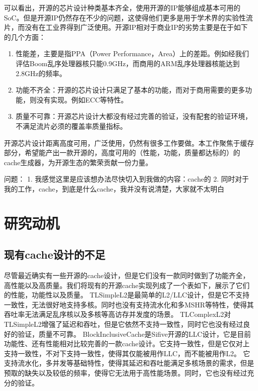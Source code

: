 可以看出，开源的芯片设计种类基本齐全，使用开源的IP能够组成基本可用的SoC。但是开源IP仍然存在不少的问题，这使得他们更多是用于学术界的实验性流片，而没有在工业界得到广泛使用。开源IP相对于商业IP的劣势主要是在于如下的几个方面：

\begin{enumerate}
	\item 性能差，主要是指PPA（Power Performance，Area）上的差距。例如经我们评估Boom乱序处理器核只能0.9GHz，而商用的ARM乱序处理器核能达到2.8GHz的频率。
	\item 功能不齐全：开源的芯片设计只满足了基本的功能，而对于商用需要的更多功能，则没有实现。例如ECC等特性。
	\item 质量不可靠：开源芯片设计大都没有经过完善的验证，没有配套的验证环境，不满足流片必须的覆盖率质量指标。
\end{enumerate}

开源芯片设计距离高度可用，广泛使用，仍然有很多工作要做。本工作聚焦于缓存部分，希望能产出一款开源的，高度可用的（性能，功能，质量都达标的）的cache生成器，为开源生态的繁荣贡献一份力量。

问题：
1. 我感觉这里是应该想办法尽快切入到我做的内容：cache的
2. 同时对于我的工作，cache，到底是什么cache，我并没有说清楚，大家就不太明白

\section{研究动机}

\subsection{现有cache设计的不足}

尽管最近确实有一些开源的cache设计，但是它们没有一款同时做到了功能齐全，高性能以及高质量。我们将现有的开源cache实现列成了一个表如下，展示了它们的性能，功能性以及质量。
TLSimpleL2是最简单的L2/LLC设计，但是它不支持一致性，无法很好地支持多核。同时也没有支持流水化和多MSHR等特性，使得其吞吐率无法满足乱序核以及多核等高访存并发度的场景。
TLComplexL2对TLSimpleL2增强了延迟和吞吐，但是它依然不支持一致性，同时它也没有经过良好的验证，质量不可靠。
BlockInclusiveCache是Sifive开源的LLC设计，它是目前功能性、还有性能相对比较完善的一款cache设计。它支持一致性，但是它仅对上支持一致性，不对下支持一致性，使得其仅能被用作LLC，而不能被用作L2。
它支持流水化，多并发等基础特性，使得其延迟和吞吐能满足多核场景的需求，但是预取的缺失以及较低的频率，使得它无法用于高性能场景。同时，它也没有经过充分的验证。

